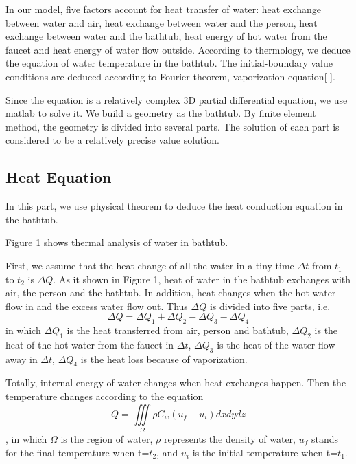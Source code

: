 \documentclass[12pt,a4paper,titlepage]{article}
\begin{document}
In our model, five factors account for heat transfer of water: heat exchange between water and air, heat
exchange between water and the person, heat exchange between water and the bathtub, heat energy of hot water from the
faucet and heat energy of water flow outside. According to thermology, we deduce the equation
of water temperature in the bathtub. The initial-boundary value conditions are deduced according to
Fourier theorem, vaporization equation[ ].

Since the equation is a relatively complex 3D partial differential equation, we use matlab to solve it.
We build a geometry as the bathtub. By finite element method, the geometry is divided into several parts.
The solution of each part is considered to be a relatively precise value solution.



\subsection{Heat Equation}
\label{sec:heat equation}

In this part, we use physical theorem to deduce the heat conduction equation
in the bathtub.

Figure 1 shows thermal analysis of water in bathtub.

First, we assume that the heat change of all the water in a tiny time $\Delta t$ from $t_1$ to $t_2$ is $\Delta Q$.
As it shown in Figure 1, heat of water in the bathtub exchanges with air, the person and the bathtub.
In addition, heat changes when the hot water flow in and the excess water flow out.
Thus $\Delta Q$ is divided into five parts, i.e.
\begin{equation}
 \Delta Q=\Delta Q_1+\Delta Q_2-\Delta Q_3-\Delta Q_4
\end{equation}
in which $\Delta Q_1$ is the heat transferred from air, person and bathtub,
$\Delta Q_2$ is the heat of the hot water from the faucet in $\Delta t$,
$\Delta Q_3$ is the heat of the water flow away in $\Delta t$,
$\Delta Q_4$ is the heat loss because of vaporization.

Totally, internal energy of water changes when heat exchanges happen.
Then the temperature changes according to the equation
\begin{equation}
 Q=\iiint\limits_{\Omega}\rho C_{w}(u_f - u_i)dx dy dz
\end{equation}
, in which $\Omega$ is the region of water, $\rho$ represents the density of water, $u_f$ stands for the final temperature when t=$t_2$, and $u_i$ is the initial temperature when t=$t_1$.
\end{document}
